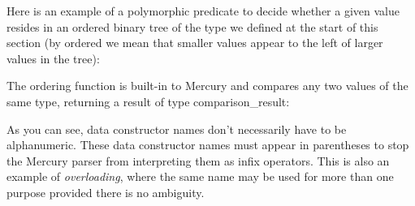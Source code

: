 \documentclass[a4paper,11pt,notitlepage,onecolumn]{book}
\begin{document}
Here is an example of a polymorphic predicate to decide whether a given
value resides in an ordered binary tree of the type we defined at the start
of this section (by ordered we mean that smaller values appear to the left
of larger values in the tree):
\begin{small}

\begin{ptabular}
\nextline
\nextline
{}
\nextline
{}
\nextline
{}
\nextline
{}
\nextline
{}
\nextline
{}
\nextline
\end{ptabular}

\end{small}
The \textsf{ordering} function is built-in to Mercury and compares any two values
of the same type, returning a result of type \textsf{comparison\_result}:
\begin{small}

\begin{ptabular}
\nextline
\end{ptabular}

\end{small}
As you can see, data constructor names don't necessarily have to be
alphanumeric.  These data constructor names must appear in parentheses to
stop the Mercury parser from interpreting them as infix operators.  This is
also an example of \emph{overloading}, where the same name may be used for
more than one purpose provided there is no ambiguity.
\end{document}
